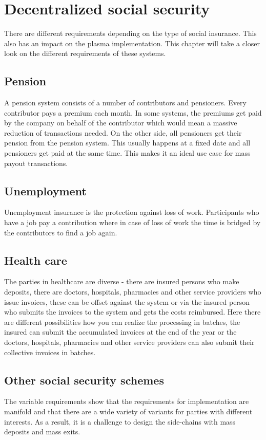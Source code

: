 \section{Decentralized social security}
There are different requirements depending on the type of social insurance. This also has an impact on the plasma implementation. This chapter will take a closer look on the different requirements of these systems. 

\subsection{Pension}
A pension system consists of a number of contributors and pensioners. Every contributor pays a premium each month. In some systems, the premiums get paid by the company on behalf of the contributor which would mean a massive reduction of transactions needed.
On the other side, all pensioners get their pension from the pension system. This usually happens at a fixed date and all pensioners get paid at the same time. This makes it an ideal use case for mass payout transactions.

\subsection{Unemployment}
Unemployment insurance is the protection against loss of work. Participants who have a job pay a contribution where in case of loss of work the time is bridged by the contributors to find a job again.

\subsection{Health care}
The parties in healthcare are diverse - there are insured persons who make deposits, there are doctors, hospitals, pharmacies and other service providers who issue invoices, these can be offset against the system or via the insured person who submits the invoices to the system and gets the costs reimbursed. Here there are different possibilities how you can realize the processing in batches, the insured can submit the accumulated invoices at the end of the year or the doctors, hospitals, pharmacies and other service providers can also submit their collective invoices in batches.

\subsection{Other social security schemes}
The variable requirements show that the requirements for implementation are manifold and that there are a wide variety of variants for parties with different interests. As a result, it is a challenge to design the side-chains with mass deposits and mass exits.

